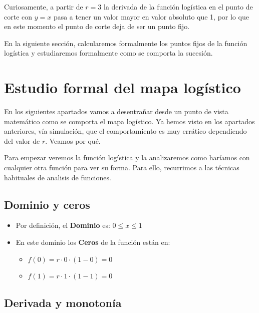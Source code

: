 \documentclass[
  10pt,
  a4paper,
  DIV=11,
  numbers=noendperiod,
  open=any]{scrreprt}
\providecommand{\tightlist}{%
  \setlength{\itemsep}{0pt}\setlength{\parskip}{0pt}}
\numberwithin{equation}{chapter}
\numberwithin{equation}{chapter}
\renewcommand{\[}{\begin{equation}}
\renewcommand{\]}{\end{equation}}
\begin{document}
Curiosamente, a partir de \(r=3\) la derivada de la función logística en
el punto de corte con \(y=x\) pasa a tener un valor mayor en valor
absoluto que 1, por lo que en este momento el punto de corte deja de ser
un punto fijo.

En la siguiente sección, calcularemos formalmente los puntos fijos de la
función logística y estudiaremos formalmente como se comporta la
sucesión.


\chapter{Estudio formal del mapa
logístico}\label{estudio-formal-del-mapa-loguxedstico}

En los siguientes apartados vamos a desentrañar desde un punto de vista
matemático como se comporta el mapa logístico. Ya hemos visto en los
apartados anteriores, vía simulación, que el comportamiento es muy
errático dependiendo del valor de \(r\). Veamos por qué.

Para empezar veremos la función logística y la analizaremos como
haríamos con cualquier otra función para ver su forma. Para ello,
recurrimos a las técnicas habituales de analisis de funciones.

\section{Dominio y ceros}\label{dominio-y-ceros}

\begin{itemize}
\tightlist
\item
  Por definición, el \textbf{Dominio} es: \(0 \le x \le 1\)\\
\item
  En este dominio los \textbf{Ceros} de la función están en:

  \begin{itemize}
  \tightlist
  \item
    \(f(0) = r \cdot 0 \cdot (1-0) = 0\)\\
  \item
    \(f(1) = r \cdot 1 \cdot (1-1) = 0\)
  \end{itemize}
\end{itemize}

\section{Derivada y monotonía}\label{derivada-y-monotonuxeda}
\end{document}
